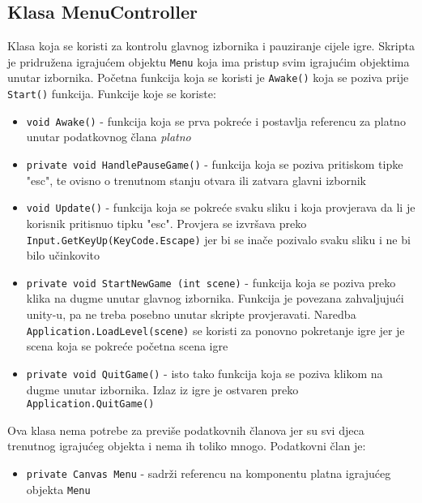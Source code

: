 \subsection{Klasa MenuController}
Klasa koja se koristi za kontrolu glavnog izbornika i pauziranje cijele igre. Skripta je pridružena igrajućem objektu \texttt{Menu} koja ima pristup svim igrajućim objektima unutar izbornika. Početna funkcija koja se koristi je \texttt{Awake()} koja se poziva prije \texttt{Start()} funkcija. Funkcije koje se koriste:
\begin{itemize}
	\item \texttt{void Awake()} - funkcija koja se prva pokreće i postavlja referencu za platno unutar podatkovnog člana \emph{platno}
	\item \texttt{private void HandlePauseGame()} - funkcija koja se poziva pritiskom tipke "esc", te ovisno o trenutnom stanju otvara ili zatvara glavni izbornik
	\item \texttt{void Update()} - funkcija koja se pokreće svaku sliku i koja provjerava da li je korisnik pritisnuo tipku "esc". Provjera se izvršava preko \texttt{Input.GetKeyUp(KeyCode.Escape)} jer bi se inače pozivalo svaku sliku i ne bi bilo učinkovito
	\item \texttt{private void StartNewGame (int scene)} - funkcija koja se poziva preko klika na dugme unutar glavnog izbornika. Funkcija je povezana zahvaljujući unity-u, pa ne treba posebno unutar skripte provjeravati. Naredba \texttt{Application.LoadLevel(scene)} se koristi za ponovno pokretanje igre jer je scena koja se pokreće početna scena igre
	\item \texttt{private void QuitGame()} - isto tako funkcija koja se poziva klikom na dugme unutar izbornika. Izlaz iz igre je ostvaren preko \newline \texttt{Application.QuitGame()}
\end{itemize}
Ova klasa nema potrebe za previše podatkovnih članova jer su svi djeca trenutnog igrajućeg objekta i nema ih toliko mnogo. Podatkovni član je:
\begin{itemize}
	\item \texttt{private Canvas Menu} - sadrži referencu na komponentu platna igrajućeg objekta \texttt{Menu}
\end{itemize}
\newpage
